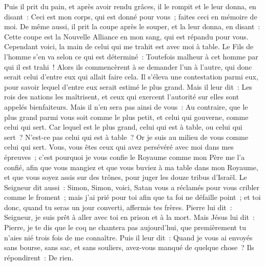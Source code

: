\begin{multicols}{2}
Puis il prit du pain, et après avoir rendu grâces, il le rompit et le leur donna, en disant~: Ceci est mon corps, qui est donné pour vous~; faites ceci en mémoire de moi.
De même aussi, il prit la coupe après le souper, et la leur donna, en disant~: Cette coupe est la Nouvelle Alliance en mon sang, qui est répandu pour vous.
Cependant voici, la main de celui qui me trahit est avec moi à table.
Le Fils de l'homme s'en va selon ce qui est déterminé~: Toutefois malheur à cet homme par qui il est trahi~!
Alors ils commencèrent à se demander l'un à l'autre, qui donc serait celui d'entre eux qui allait faire cela.
Il s'éleva une contestation parmi eux, pour savoir lequel d'entre eux serait estimé le plus grand.
Mais il leur dit~: Les rois des nations les maîtrisent, et ceux qui exercent l'autorité sur elles sont appelés bienfaiteurs.
Mais il n'en sera pas ainsi de vous~: Au contraire, que le plus grand parmi vous soit comme le plus petit, et celui qui gouverne, comme celui qui sert.
Car lequel est le plus grand, celui qui est à table, ou celui qui sert~? N'est-ce pas celui qui est à table~? Or je suis au milieu de vous comme celui qui sert.
Vous, vous êtes ceux qui avez persévéré avec moi dans mes épreuves~;
c'est pourquoi je vous confie le Royaume comme mon Père me l'a confié,
afin que vous mangiez et que vous buviez à ma table dans mon Royaume, et que vous soyez assis sur des trônes, pour juger les douze tribus d'Israël.
Le Seigneur dit aussi~: Simon, Simon, voici, Satan vous a réclamés pour vous cribler comme le froment~;
mais j'ai prié pour toi afin que ta foi ne défaille point~; et toi donc, quand tu seras un jour converti, affermis tes frères.
Pierre lui dit~: Seigneur, je suis prêt à aller avec toi en prison et à la mort.
Mais Jésus lui dit~: Pierre, je te dis que le coq ne chantera pas aujourd'hui, que premièrement tu n'aies nié trois fois de me connaître.
Puis il leur dit~: Quand je vous ai envoyés sans bourse, sans sac, et sans souliers, avez-vous manqué de quelque chose~? Ils répondirent~: De rien.

\end{multicols}
